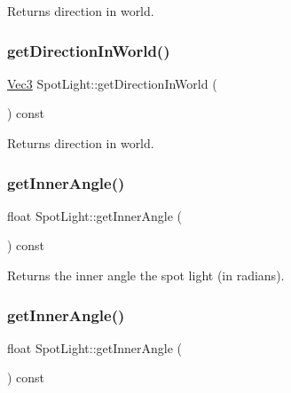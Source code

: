 Returns direction in world. \mbox{\label{classSpotLight_a23a7a4f9925c546fdbf26f48f07ecd9a}} 
\subsubsection{\texorpdfstring{get\+Direction\+In\+World()}{getDirectionInWorld()}\hspace{0.1cm}{\footnotesize\ttfamily [2/2]}}
{\footnotesize\ttfamily \hyperlink{classVec3}{Vec3} Spot\+Light\+::get\+Direction\+In\+World (\begin{DoxyParamCaption}{ }\end{DoxyParamCaption}) const}

Returns direction in world. \mbox{\label{classSpotLight_ab03215482880740310ed24868e544c8d}} 
\subsubsection{\texorpdfstring{get\+Inner\+Angle()}{getInnerAngle()}\hspace{0.1cm}{\footnotesize\ttfamily [1/2]}}
{\footnotesize\ttfamily float Spot\+Light\+::get\+Inner\+Angle (\begin{DoxyParamCaption}{ }\end{DoxyParamCaption}) const\hspace{0.3cm}{\ttfamily [inline]}}

Returns the inner angle the spot light (in radians). \mbox{\label{classSpotLight_ab03215482880740310ed24868e544c8d}} 
\subsubsection{\texorpdfstring{get\+Inner\+Angle()}{getInnerAngle()}\hspace{0.1cm}{\footnotesize\ttfamily [2/2]}}
{\footnotesize\ttfamily float Spot\+Light\+::get\+Inner\+Angle (\begin{DoxyParamCaption}{ }\end{DoxyParamCaption}) const\hspace{0.3cm}{\ttfamily [inline]}}

